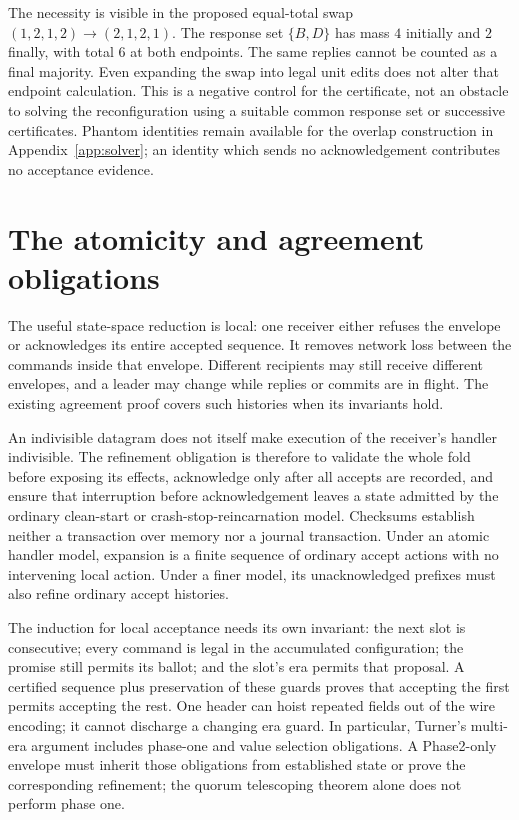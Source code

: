 The necessity is visible in the proposed equal-total swap
$(1,2,1,2)\to(2,1,2,1)$. The response set $\{B,D\}$ has mass $4$ initially
and $2$ finally, with total $6$ at both endpoints. The same replies cannot be
counted as a final majority. Even expanding the swap into legal unit edits
does not alter that endpoint calculation. This is a negative control for the
certificate, not an obstacle to solving the reconfiguration using a suitable
common response set or successive certificates. Phantom identities remain
available for the overlap construction in Appendix~\ref{app:solver}; an
identity which sends no acknowledgement contributes no acceptance evidence.

\section{The atomicity and agreement obligations}\label{sec:fuse-refinement}
The useful state-space reduction is local: one receiver either refuses the
envelope or acknowledges its entire accepted sequence. It removes network
loss between the commands inside that envelope. Different recipients may
still receive different envelopes, and a leader may change while replies or
commits are in flight. The existing agreement proof covers such histories
when its invariants hold.

An indivisible datagram does not itself make execution of the receiver's
handler indivisible. The refinement obligation is therefore to validate the
whole fold before exposing its effects, acknowledge only after all accepts
are recorded, and ensure that interruption before acknowledgement leaves a
state admitted by the ordinary clean-start or crash-stop-reincarnation model.
Checksums establish neither a transaction over memory nor a journal
transaction. Under an atomic handler model, expansion is a finite sequence of
ordinary accept actions with no intervening local action. Under a finer model,
its unacknowledged prefixes must also refine ordinary accept histories.

The induction for local acceptance needs its own invariant: the next slot is
consecutive; every command is legal in the accumulated configuration; the
promise still permits its ballot; and the slot's era permits that proposal.
A certified sequence plus preservation of these guards proves that accepting
the first permits accepting the rest. One header can hoist repeated
fields out of the wire encoding; it cannot discharge a changing era guard.
In particular, Turner's multi-era argument includes phase-one and value
selection obligations. A Phase2-only envelope must inherit those obligations
from established state or prove the corresponding refinement; the quorum
telescoping theorem alone does not perform phase one.

